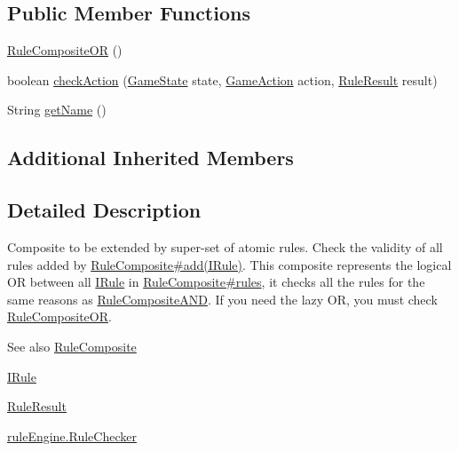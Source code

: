 \subsection*{Public Member Functions}
\begin{DoxyCompactItemize}
\item 
\mbox{\hyperlink{classrule_engine_1_1rules_1_1new_rules_1_1_rule_composite_o_r_ab524affe05a2f7ef6ddb512c45b3a936}{Rule\+Composite\+OR}} ()
\item 
boolean \mbox{\hyperlink{classrule_engine_1_1rules_1_1new_rules_1_1_rule_composite_o_r_ae6975e9b9943319bcaa0608bfdc56207}{check\+Action}} (\mbox{\hyperlink{classgame_1_1game_state_1_1_game_state}{Game\+State}} state, \mbox{\hyperlink{classrule_engine_1_1_game_action}{Game\+Action}} action, \mbox{\hyperlink{classrule_engine_1_1_rule_result}{Rule\+Result}} result)
\item 
String \mbox{\hyperlink{classrule_engine_1_1rules_1_1new_rules_1_1_rule_composite_o_r_a5188ec90f3d18b5fc6f2f7eea8ece5c6}{get\+Name}} ()
\end{DoxyCompactItemize}
\subsection*{Additional Inherited Members}


\subsection{Detailed Description}
Composite to be extended by super-\/set of atomic rules. Check the validity of all rules added by \mbox{\hyperlink{classrule_engine_1_1rules_1_1new_rules_1_1_rule_composite_a4970c2904b55542c6c7323195a38c845}{Rule\+Composite\#add(\+I\+Rule)}}. This composite represents the logical OR between all \mbox{\hyperlink{interfacerule_engine_1_1rules_1_1new_rules_1_1_i_rule}{I\+Rule}} in \mbox{\hyperlink{classrule_engine_1_1rules_1_1new_rules_1_1_rule_composite_a0f873c0c52e3cf4815d5b09a5ca2ae7f}{Rule\+Composite\#rules}}, it checks all the rules for the same reasons as \mbox{\hyperlink{classrule_engine_1_1rules_1_1new_rules_1_1_rule_composite_a_n_d}{Rule\+Composite\+A\+ND}}. If you need the lazy OR, you must check \mbox{\hyperlink{classrule_engine_1_1rules_1_1new_rules_1_1_rule_composite_o_r}{Rule\+Composite\+OR}}.

\begin{DoxySeeAlso}{See also}
\mbox{\hyperlink{classrule_engine_1_1rules_1_1new_rules_1_1_rule_composite}{Rule\+Composite}} 

\mbox{\hyperlink{interfacerule_engine_1_1rules_1_1new_rules_1_1_i_rule}{I\+Rule}} 

\mbox{\hyperlink{classrule_engine_1_1_rule_result}{Rule\+Result}} 

\mbox{\hyperlink{classrule_engine_1_1_rule_checker}{rule\+Engine.\+Rule\+Checker}} 
\end{DoxySeeAlso}


